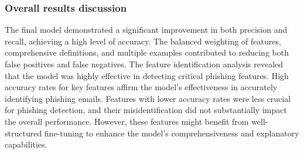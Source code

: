 \subsubsection{Overall results discussion}
\label{sec:overallvalidation}

The final model demonstrated a significant improvement in both precision and recall, achieving a high level of accuracy. The balanced weighting of features, comprehensive definitions, and multiple examples contributed to reducing both false positives and false negatives. The feature identification analysis revealed that the model was highly effective in detecting critical phishing features. High accuracy rates for key features affirm the model's effectiveness in accurately identifying phishing emails. Features with lower accuracy rates were less crucial for phishing detection, and their misidentification did not substantially impact the overall performance. However, these features might benefit from well-structured fine-tuning to enhance the model's comprehensiveness and explanatory capabilities.

